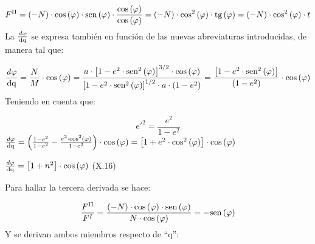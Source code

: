 \documentclass{tufte-book}
\newcommand\normalsubformula[1]{\text{\mathversion{normal}$#1$}}
\begin{document}
\begin{equation*}
{F^{{\normalsubformula{\text{II}}}}=\left(-N\right)\cdot
\text{cos}\left(\varphi \right)\cdot
\normalsubformula{\text{sen}}\left(\varphi \right)\cdot
{\frac{\text{cos}\left(\varphi \right)}{\text{cos}\left(\varphi
\right)}}=\left(-N\right)\cdot \text{cos}^{{2}}\left(\varphi
\right)\cdot \normalsubformula{\text{tg}}\left(\varphi
\right)=\left(-N\right)\cdot \text{cos}^{{2}}\left(\varphi \right)\cdot
t}
\end{equation*}
La  ${\frac{\mathit{d\varphi }}{\normalsubformula{\text{dq}}}}$ se
expresa también en función de las nuevas abreviaturas introducidas,
de manera tal que:

\begin{equation*}
{\frac{\mathit{d\varphi
}}{\normalsubformula{\text{dq}}}=\frac{N}{M}\cdot
\text{cos}\left(\varphi \right)=\frac{a\cdot \left[1-e^{{2}}\cdot
\normalsubformula{\text{sen}}^{{2}}\left(\varphi
\right)\right]^{{3/2}}\cdot \text{cos}\left(\varphi
\right)}{\left[1-e^{{2}}\cdot
\normalsubformula{\text{sen}}^{{2}}\left(\varphi
\right)\right]^{{1/2}}\cdot a\cdot
\left(1-e^{{2}}\right)}=\frac{\left[1-e^{{2}}\cdot
\normalsubformula{\text{sen}}^{{2}}\left(\varphi
\right)\right]}{\left(1-e^{{2}}\right)}\cdot \text{cos}\left(\varphi
\right)}
\end{equation*}
Teniendo en cuenta que:

\begin{equation*}
{e'^{{2}}=\frac{e^{{2}}}{1-e^{{2}}}}
\end{equation*}
 ${\frac{\mathit{d\varphi
}}{\normalsubformula{\text{dq}}}=\left(\frac{1-e^{{2}}}{1-e^{{2}}}-\frac{e^{{2}}\cdot
\text{cos}^{{2}}\left(\varphi \right)}{1-e^{{2}}}\right)\cdot
\text{cos}\left(\varphi \right)=\left[1+e^{{2}}\cdot
\text{cos}^{{2}}\left(\varphi \right)\right]\cdot
\text{cos}\left(\varphi \right)}$

 ${\frac{\mathit{d\varphi
}}{\normalsubformula{\text{dq}}}=\left[1+n^{{2}}\right]\cdot
\text{cos}\left(\varphi \right)}$  (X.16)

Para hallar la tercera derivada se hace:

\begin{equation*}
{\frac{F^{{\normalsubformula{\text{II}}}}}{F^{{I}}}=\frac{\left(-N\right)\cdot
\text{cos}\left(\varphi \right)\cdot
\normalsubformula{\text{sen}}\left(\varphi \right)}{N\cdot
\text{cos}\left(\varphi
\right)}=-\normalsubformula{\text{sen}}\left(\varphi \right)}
\end{equation*}
Y se derivan ambos miembros respecto de
{\textquotedblleft}q{\textquotedblright}:
\end{document}
